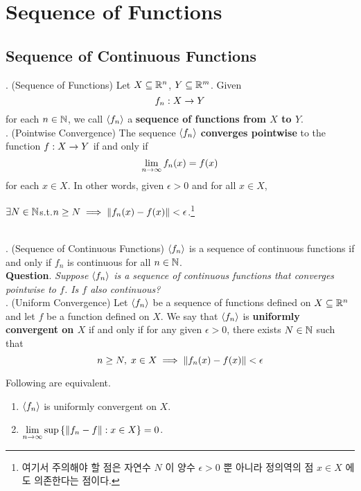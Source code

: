 \chapter{Sequence of Functions}

\section{Sequence of Continuous Functions}

. (Sequence of Functions) Let \(X \subseteq \mathbb{R}^n\), \(Y \subseteq \mathbb{R}^m\). Given
\[
	f_n: X\rightarrow Y
\]
for each \(n\in \mathbb{N}\), we call \(\left\langle f_n \right\rangle\) a \textbf{sequence of functions from \(X\) to \(Y\)}.
\\

. (Pointwise Convergence) The sequence \(\left\langle f_n \right\rangle\) \textbf{converges pointwise} to the function \(f: X \rightarrow Y\) if and only if
\[
	\lim_{n\rightarrow \infty} f_n(x) = f(x)
\]
for each \(x \in X\). In other words, given \(\epsilon > 0\) and for all \(x \in X\),
\begin{center}
	\(\exists N\in \mathbb{N}\)\quad  s.t.\quad \(n \geq N \implies \left\lVert f_n(x) - f(x)\right\rVert < \epsilon\).\footnote{여기서 주의해야 할 점은 자연수 \(N\) 이 양수 \(\epsilon > 0\) 뿐 아니라 정의역의 점 \(x\in X\) 에도 의존한다는 점이다.}
\end{center}
~\\
. (Sequence of Continuous Functions) \(\left\langle f_n \right\rangle\) is a sequence of continuous functions if and only if \(f_n\) is continuous for all \(n\in \mathbb{N}\).
\\

\textbf{Question}. \textit{Suppose \(\left\langle f_n \right\rangle\) is a sequence of continuous functions that converges pointwise to \(f\). Is \(f\) also continuous?}
\\

. (Uniform Convergence) Let \(\left\langle f_n \right\rangle\) be a sequence of functions defined on \(X \subseteq \mathbb{R}^n\) and let \(f\) be a function defined on \(X\). We say that \(\left\langle f_n \right\rangle\) is \textbf{uniformly convergent on \(X\)} if and only if for any given \(\epsilon > 0\), there exists \(N\in \mathbb{N}\) such that
\[
	n\geq N,\; x\in X \implies \left\lVert f_n(x) - f(x)\right\rVert < \epsilon
\]

\clearpage

 Following are equivalent.
\begin{enumerate}
	\item \(\left\langle f_n \right\rangle\) is uniformly convergent on \(X\).
	\item \(\displaystyle \lim_{n\rightarrow \infty} \sup \left\{\left\lVert f_n-f\right\rVert: x\in X\right\} = 0\).
\end{enumerate}

